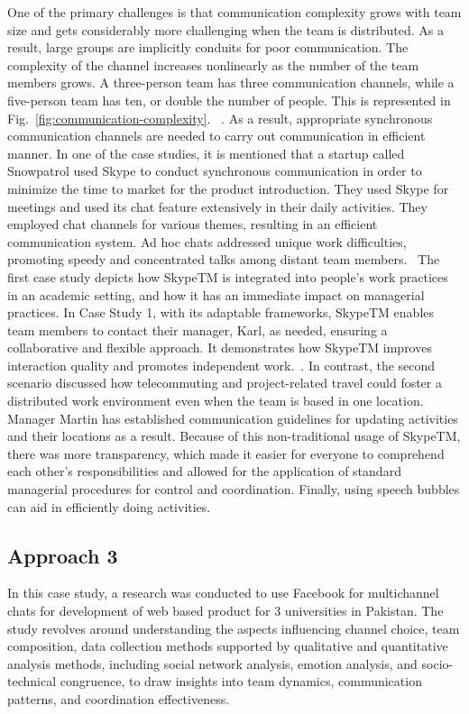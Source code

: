 \documentclass{llncs}
\begin{document}
One of the primary challenges is that communication complexity grows with team size and gets considerably more challenging when the team is distributed. As a result, large groups are implicitly conduits for poor communication. The complexity of the channel increases nonlinearly as the number of the team members grows. A three-person team has three communication channels, while a five-person team has ten, or double the number of people. This is represented in Fig.~\ref{fig:communication-complexity}. ~\cite{refpaper6}. As a result, appropriate synchronous communication channels are needed to carry out communication in efficient manner. In one of the case studies, it is mentioned that a startup called Snowpatrol used Skype to conduct synchronous communication in order to minimize the time to market for the product introduction. They used Skype for meetings and used its chat feature extensively in their daily activities. They employed chat channels for various themes, resulting in an efficient communication system. Ad hoc chats addressed unique work difficulties, promoting speedy and concentrated talks among distant team members.~\cite{refpaper7} The first case study depicts how SkypeTM is integrated into people's work practices in an academic setting, and how it has an immediate impact on managerial practices. In Case Study 1, with its adaptable frameworks, SkypeTM enables team members to contact their manager, Karl, as needed, ensuring a collaborative and flexible approach. It demonstrates how SkypeTM improves interaction quality and promotes independent work.~\cite{refpaper7}. In contrast, the second scenario discussed how telecommuting and project-related travel could foster a distributed work environment even when the team is based in one location.  Manager Martin has established communication guidelines for updating activities and their locations as a result. Because of this non-traditional usage of SkypeTM, there was more transparency, which made it easier for everyone to comprehend each other's responsibilities and allowed for the application of standard managerial procedures for control and coordination. Finally, using speech bubbles can aid in efficiently doing activities.~\cite{refpaper7}

\subsection{Approach 3}
In this case study, a research was conducted to use Facebook for multichannel chats for development of web based product for 3 universities in Pakistan. The study revolves around understanding the aspects  influencing channel choice, team composition, data collection methods supported by qualitative and quantitative analysis methods, including social network analysis, emotion analysis, and socio-technical congruence, to draw insights into team dynamics, communication patterns, and coordination effectiveness. ~\cite{refpaper8}
\end{document}
